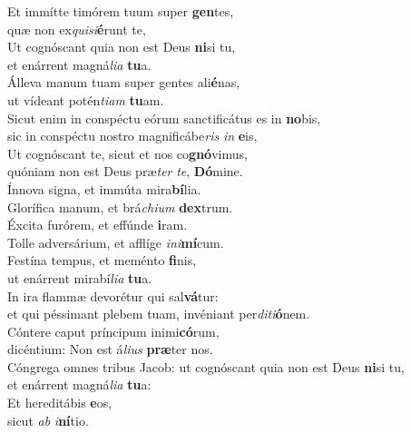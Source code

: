 \evenverse Et immítte timórem tuum super \textbf{gen}tes,~\*\\
\evenverse quæ non ex\textit{qui}\textit{si}\textbf{é}runt te,\\
\oddverse Ut cognóscant quia non est Deus \textbf{ni}si tu,~\*\\
\oddverse et enárrent magná\textit{li}\textit{a} \textbf{tu}a.\\
\evenverse Álleva manum tuam super gentes ali\textbf{é}nas,~\*\\
\evenverse ut vídeant potén\textit{ti}\textit{am} \textbf{tu}am.\\
\oddverse Sicut enim in conspéctu eórum sanctificátus es in \textbf{no}bis,~\*\\
\oddverse sic in conspéctu nostro magnificábe\textit{ris} \textit{in} \textbf{e}is,\\
\evenverse Ut cognóscant te, sicut et nos co\textbf{gnó}vimus,~\*\\
\evenverse quóniam non est Deus præ\textit{ter} \textit{te}, \textbf{Dó}mine.\\
\oddverse Ínnova signa, et immúta mira\textbf{bí}lia.~\*\\
\oddverse Glorífica manum, et brá\textit{chi}\textit{um} \textbf{dex}trum.\\
\evenverse Éxcita furórem, et effúnde \textbf{i}ram.~\*\\
\evenverse Tolle adversárium, et afflíge \textit{i}\textit{ni}\textbf{mí}cum.\\
\oddverse Festína tempus, et meménto \textbf{fi}nis,~\*\\
\oddverse ut enárrent mirabí\textit{li}\textit{a} \textbf{tu}a.\\
\evenverse In ira flammæ devorétur qui sal\textbf{vá}tur:~\*\\
\evenverse et qui péssimant plebem tuam, invéniant per\textit{di}\textit{ti}\textbf{ó}nem.\\
\oddverse Cóntere caput príncipum inimi\textbf{có}rum,~\*\\
\oddverse dicéntium: Non est á\textit{li}\textit{us} \textbf{præ}ter nos.\\
\evenverse Cóngrega omnes tribus Jacob: ut cognóscant quia non est Deus \textbf{ni}si tu,~\*\\
\evenverse et enárrent magná\textit{li}\textit{a} \textbf{tu}a:\\
\oddverse Et hereditábis \textbf{e}os,~\*\\
\oddverse sicut \textit{ab} \textit{i}\textbf{ní}tio.\\
